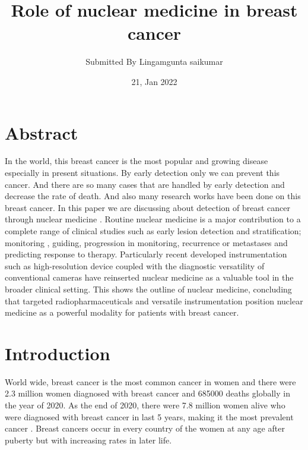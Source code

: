 \documentclass{article}
\title{Role of nuclear medicine in breast cancer}
\author{Submitted By Lingamgunta saikumar}
\date{21, Jan 2022}
\begin{document}
\maketitle

\section{Abstract}
In the world, this breast cancer is the most popular and growing disease especially in present 
situations. By early detection only we can prevent this cancer. And there are so many cases that 
are handled by early detection and decrease the rate of death. And also many research works 
have been done on this breast cancer. In this paper we are discussing about detection of breast 
cancer through nuclear medicine . Routine nuclear medicine is a major contribution to a 
complete range of clinical studies such as early lesion detection and stratification; monitoring , 
guiding, progression in monitoring, recurrence or metastases and predicting response to 
therapy. Particularly recent developed instrumentation such as high-resolution device coupled 
with the diagnostic versatility of conventional cameras have reinserted nuclear medicine as a 
valuable tool in the broader clinical setting. This shows the outline of nuclear medicine, 
concluding that targeted radiopharmaceuticals and versatile instrumentation position nuclear
medicine as a powerful modality for patients with breast cancer.
\section{Introduction}
World wide, breast cancer is the most common cancer in women and there were 2.3 million 
women diagnosed with breast cancer and 685000 deaths globally in the year of 2020. As the end 
of 2020, there were 7.8 million women alive who were diagnosed with breast cancer in last 5 
years, making it the most prevalent cancer . Breast cancers occur in every country of the women 
at any age after puberty but with increasing rates in later life.
\end{document}
